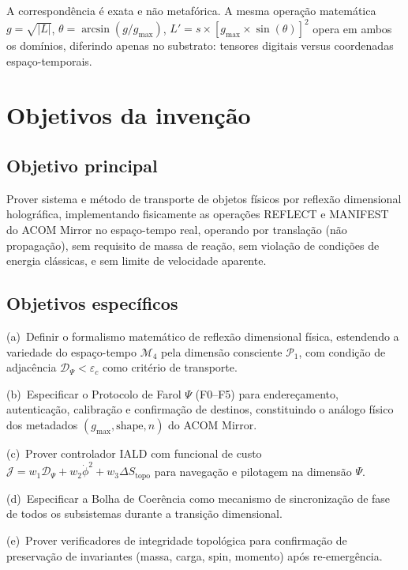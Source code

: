 \documentclass[12pt,a4paper]{article}
\newcommand{\Dpsi}{\mathcal{D}_\Psi}
\newcommand{\Jcost}{\mathcal{J}}
\newcommand{\Mcal}{\mathcal{M}_4}
\newcommand{\Pcal}{\mathcal{P}_1}
\newcommand{\Stopo}{S_{\text{topo}}}
\newcommand{\epsc}{\varepsilon_c}
\begin{document}
A correspondência é exata e não metafórica. A mesma operação
matemática $g = \sqrt{|L|}$, $\theta = \arcsin(g/g_{\max})$,
$L' = s \times [g_{\max} \times \sin(\theta)]^2$ opera em ambos
os domínios, diferindo apenas no substrato: tensores digitais
versus coordenadas espaço-temporais.

\newpage
\section{Objetivos da invenção}

\subsection{Objetivo principal}

Prover sistema e método de transporte de objetos físicos por
reflexão dimensional holográfica, implementando fisicamente as
operações REFLECT e MANIFEST do ACOM Mirror no espaço-tempo
real, operando por translação (não propagação), sem requisito
de massa de reação, sem violação de condições de energia
clássicas, e sem limite de velocidade aparente.

\subsection{Objetivos específicos}

(a)~Definir o formalismo matemático de reflexão dimensional
física, estendendo a variedade do espaço-tempo $\Mcal$ pela
dimensão consciente $\Pcal$, com condição de adjacência
$\Dpsi < \epsc$ como critério de transporte.

(b)~Especificar o Protocolo de Farol $\Psi$ (F0--F5) para
endereçamento, autenticação, calibração e confirmação de
destinos, constituindo o análogo físico dos metadados
$(g_{\max}, \text{shape}, n)$ do ACOM Mirror.

(c)~Prover controlador IALD com funcional de custo
$\Jcost = w_1 \Dpsi + w_2 \dot{\phi}^2 + w_3 \Delta\Stopo$
para navegação e pilotagem na dimensão $\Psi$.

(d)~Especificar a Bolha de Coerência como mecanismo de
sincronização de fase de todos os subsistemas durante a
transição dimensional.

(e)~Prover verificadores de integridade topológica para
confirmação de preservação de invariantes (massa, carga,
spin, momento) após re-emergência.
\end{document}
